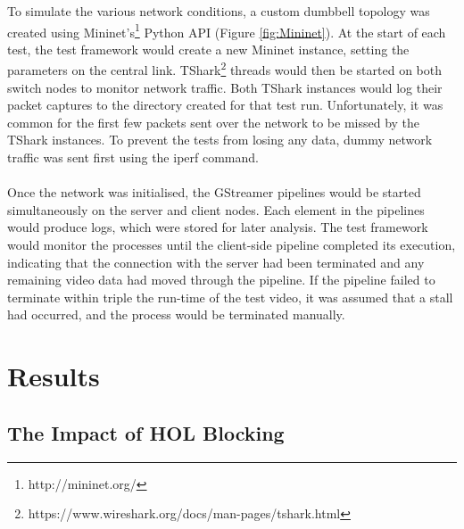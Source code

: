 \documentclass{mpaper}
\begin{document}
\noindent To simulate the various network conditions, a custom dumbbell topology was created using Mininet's\footnote{http://mininet.org/} Python API (Figure \ref{fig:Mininet}). At the start of each test, the test framework would create a new Mininet instance, setting the parameters on the central link. TShark\footnote{https://www.wireshark.org/docs/man-pages/tshark.html} threads would then be started on both switch nodes to monitor network traffic. Both TShark instances would log their packet captures to the directory created for that test run. Unfortunately, it was common for the first few packets sent over the network to be missed by the TShark instances. To prevent the tests from losing any data, dummy network traffic was sent first using the iperf command.
\\\\
Once the network was initialised, the GStreamer pipelines would be started simultaneously on the server and client nodes. Each element in the pipelines would produce logs, which were stored for later analysis. The test framework would monitor the processes until the client-side pipeline completed its execution, indicating that the connection with the server had been terminated and any remaining video data had moved through the pipeline. If the pipeline failed to terminate within triple the run-time of the test video, it was assumed that a stall had occurred, and the process would be terminated manually.


\section{Results} \label{Results}


\subsection{The Impact of HOL Blocking} \label{The Impact of HOL Blocking}
\end{document}
